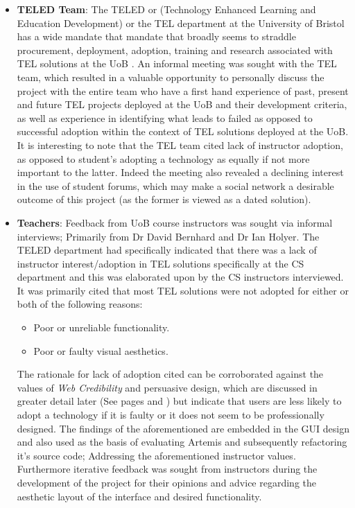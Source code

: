 \begin{itemize}
    \item \textbf{TELED Team}: The TELED or (Technology Enhanced Learning and Education Development) or the TEL department at the University of Bristol has a wide mandate that mandate that broadly seems to straddle procurement, deployment, adoption, training and research associated with TEL solutions at the UoB \cite{UniversityofBristol}. An informal meeting was sought with the TEL team, which resulted in a valuable opportunity to personally discuss the project with the entire team who have a first hand experience of past, present and future TEL projects deployed at the UoB and their development criteria, as well as experience in identifying what leads to failed as opposed to successful adoption within the context of TEL solutions deployed at the UoB. It is interesting to note that the TEL team cited lack of instructor adoption, as opposed to student's adopting a technology as equally if not more important to the latter. Indeed the meeting also revealed a declining interest in the use of student forums, which may make a social network a desirable outcome of this project (as the former is viewed as a dated solution).
    
    \item \textbf{Teachers}: Feedback from UoB course instructors was sought via informal interviews; Primarily from Dr David Bernhard and Dr Ian Holyer. The TELED department had specifically indicated that there was a lack of instructor interest/adoption in TEL solutions specifically at the CS department and this was elaborated upon by the CS instructors interviewed. It was primarily cited that most TEL solutions were not adopted for either or both of the following reasons:
    
    \begin{itemize}
        \item Poor or unreliable functionality.
        \item Poor or faulty visual aesthetics.
    \end{itemize}
    
    
    The rationale for lack of adoption cited can be corroborated against the values of \textit{Web Credibility} and persuasive design, which are discussed in greater detail later (See pages \textbf{\pageref{proffessional}} and \textbf{\pageref{avoidError}}) but indicate that users are less likely to adopt a technology if it is faulty or it does not seem to be professionally designed. The findings of the aforementioned are embedded in the GUI design and also used as the basis of evaluating Artemis and subsequently refactoring it's source code; Addressing the aforementioned instructor values. Furthermore iterative feedback was sought from instructors during the development of the project for their opinions and advice regarding the aesthetic layout of the interface and desired functionality.



\end{itemize}
